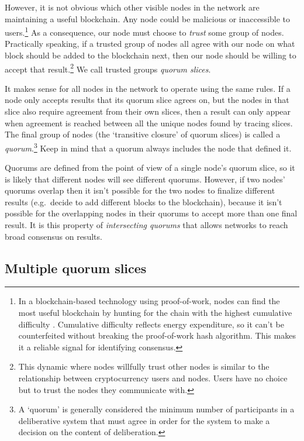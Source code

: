 However, it is not obvious which other visible nodes in the network are maintaining a useful blockchain. Any node could be malicious or inaccessible to users.\footnote{In a blockchain-based technology using proof-of-work, nodes can find the most useful blockchain by hunting for the chain with the highest cumulative difficulty \cite{Nakamoto_bitcoin}. Cumulative difficulty reflects energy expenditure, so it can't be counterfeited without breaking the proof-of-work hash algorithm. This makes it a reliable signal for identifying consensus.} As a consequence, our node must choose to {\em trust} some group of nodes. Practically speaking, if a trusted group of nodes all agree with our node on what block should be added to the blockchain next, then our node should be willing to accept that result.\footnote{This dynamic where nodes willfully trust other nodes is similar to the relationship between cryptocurrency users and nodes. Users have no choice but to trust the nodes they communicate with.} We call trusted groups {\em quorum slices}.

It makes sense for all nodes in the network to operate using the same rules. If a node only accepts results that its quorum slice agrees on, but the nodes in that slice also require agreement from their own slices, then a result can only appear when agreement is reached between all the unique nodes found by tracing slices. The final group of nodes (the `transitive closure' of quorum slices) is called a {\em quorum}.\footnote{A `quorum' is generally considered the minimum number of participants in a deliberative system that must agree in order for the system to make a decision on the content of deliberation.} Keep in mind that a quorum always includes the node that defined it.

Quorums are defined from the point of view of a single node's quorum slice, so it is likely that different nodes will see different quorums. However, if two nodes' quorums overlap then it isn't possible for the two nodes to finalize different results (e.g.\ decide to add different blocks to the blockchain), because it isn't possible for the overlapping nodes in their quorums to accept more than one final result. It is this property of {\em intersecting quorums} that allows networks to reach broad consensus on results.


\subsection{Multiple quorum slices}
\label{subsec:consensus-multiple-quorum-slices}


